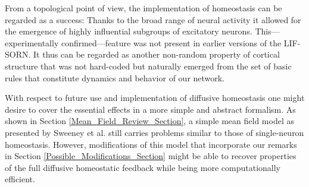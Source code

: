 \documentclass[10pt,a4paper]{article}
\begin{document}
From a topological point of view, the implementation of homeostasis can be regarded as a success: Thanks to the broad range of neural activity it allowed for the emergence of highly influential subgroups of excitatory neurons. This---experimentally confirmed---feature was not present in earlier versions of the LIF-SORN. It thus can be regarded as another non-random property of cortical structure that was not hard-coded but naturally emerged from the set of basic rules that constitute dynamics and behavior of our network.

With respect to future use and implementation of diffusive homeostasis one might desire to cover the essential effects in a more simple and abstract formalism. As shown in Section \ref{Mean_Field_Review_Section}, a simple mean field model as presented by Sweeney et al. still carries problems similar to those of single-neuron homeostasis. However, modifications of this model that incorporate our remarks in Section \ref{Possible_Modifications_Section} might be able to recover properties of the full diffusive homeostatic feedback while being more computationally efficient.   

\clearpage


\end{document}
